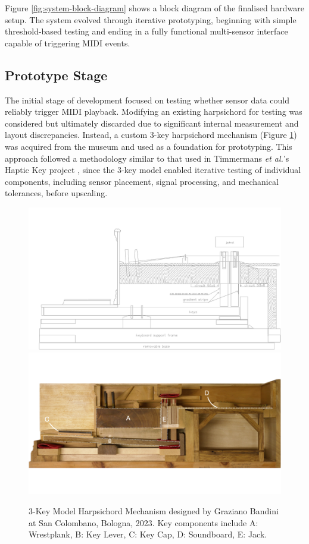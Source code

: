 Figure \ref{fig:system-block-diagram} shows a block diagram of the finalised hardware setup. The system evolved through iterative prototyping, beginning with simple threshold-based testing and ending in a fully functional multi-sensor interface capable of triggering MIDI events. 

\subsection{Prototype Stage}

The initial stage of development focused on testing whether sensor data could reliably trigger MIDI playback. Modifying an existing harpsichord for testing was considered but ultimately discarded due to significant internal measurement and layout discrepancies. Instead, a custom 3-key harpsichord mechanism (Figure \ref{fig:3key}) was acquired from the museum and used as a foundation for prototyping. This approach followed a methodology similar to that used in Timmermans \emph{et al.}'s Haptic Key project \cite{Timmermans2020}, since the 3-key model enabled iterative testing of individual components, including sensor placement, signal processing, and mechanical tolerances, before upscaling. 

\begin{figure}
    \centering
    \includegraphics[width=\linewidth]{src/images/CrossSectionSensorPlacement.jpg}
    \\
    \includegraphics[width=\linewidth]{src/images/3-key-side-labelled.png}
    \caption{3-Key Model Harpsichord Mechanism designed by Graziano Bandini at San Colombano, Bologna, 2023. Key components include A: Wrestplank, B: Key Lever, C: Key Cap, D: Soundboard, E: Jack.}
    \label{fig:3key}
\end{figure}


